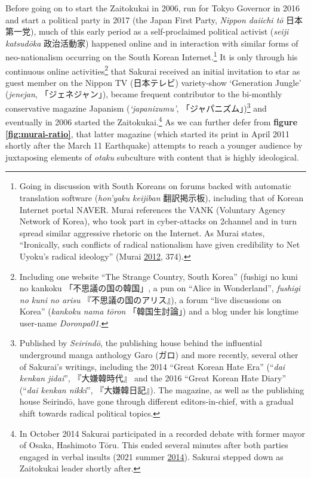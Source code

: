 \documentclass[10pt,british,A4paper,twoside]{memoir}
\begin{document}
Before going on to start the Zaitokukai in 2006, run for Tokyo Governor
in 2016 and start a political party in 2017 (the Japan First Party,
\emph{Nippon daiichi tō} 日本第一党), much of this early period as a
self-proclaimed political activist (\emph{seiji katsudōka} 政治活動家)
happened online and in interaction with similar forms of neo-nationalism
occurring on the South Korean Internet.\footnote{Going in discussion
  with South Koreans on forums backed with automatic translation
  software (\emph{hon'yaku keijiban} 翻訳掲示板), including that of
  Korean Internet portal NAVER. Murai references the VANK (Voluntary
  Agency Network of Korea), who took part in cyber-attacks on 2channel
  and in turn spread similar aggressive rhetoric on the Internet. As
  Murai states, ``Ironically, such conflicts of radical nationalism have
  given credibility to Net Uyoku's radical ideology'' (Murai
  \protect\hyperlink{ref-murai_net_2012}{2012}, 374).} It is only
through his continuous online activities\footnote{Including one website
  ``The Strange Country, South Korea'' (fushigi no kuni no kankoku
  「不思議の国の韓国」, a pun on ``Alice in Wonderland'', \emph{fushigi
  no kuni no arisu} 『不思議の国のアリス』), a forum ``live discussions
  on Korea'' (\emph{kankoku nama tōron} 「韓国生討論」) and a blog under
  his longtime user-name \emph{Doronpa01}.} that Sakurai received an
initial invitation to star as guest member on the Nippon TV (日本テレビ)
variety-show `Generation Jungle' (\emph{jenejan}, 「ジェネジャン」),
became frequent contributor to the bi-monthly conservative magazine
Japanism (\emph{`japanizumu'}, 「ジャパニズム」)\footnote{Published by
  \emph{Seirindō}, the publishing house behind the influential
  underground manga anthology Garo (ガロ) and more recently, several
  other of Sakurai's writings, including the 2014 ``Great Korean Hate
  Era'' (``\emph{dai kenkan jidai}'', 『大嫌韓時代』 and the 2016
  ``Great Korean Hate Diary'' (``\emph{dai kenkan nikki}'',
  『大嫌韓日記』). The magazine, as well as the publishing house
  Seirindō, have gone through different editors-in-chief, with a gradual
  shift towards radical political topics.} and eventually in 2006
started the Zaitokukai.\footnote{In October 2014 Sakurai participated in
  a recorded debate with former mayor of Osaka, Hashimoto Tōru. This
  ended several minutes after both parties engaged in verbal insults
  (2021 summer \protect\hyperlink{ref-2021_summer_vs_2014}{2014}).
  Sakurai stepped down as Zaitokukai leader shortly after.} As we can
further defer from \textbf{figure \ref{fig:murai-ratio}}, that latter
magazine (which started its print in April 2011 shortly after the March
11 Earthquake) attempts to reach a younger audience by juxtaposing
elements of \emph{otaku} subculture with content that is highly
ideological.
\end{document}
